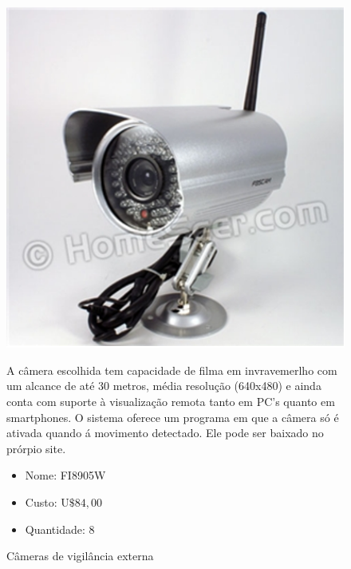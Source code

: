 \begin{enumerate}
\begin{figure}[h]
	  \begin{center}
		\includegraphics[keepaspectratio,scale=0.5]{figuras/camera.eps}
		\caption{Câmeras de vigilância externa}
	  \end{center}
	
	A câmera escolhida tem capacidade de filma em invravemerlho com um alcance de até 30 metros, média resolução (640x480) e ainda conta com suporte à visualização remota tanto em PC’s quanto em smartphones. O sistema oferece um programa em que a câmera só é ativada quando á movimento detectado. Ele pode ser baixado no prórpio site.

	\begin{itemize}
		\item Nome: FI8905W
		\item Custo: U$\$ 84,00$
		\item Quantidade: 8
	\end{itemize}	
	\end{figure}

\end{enumerate}

